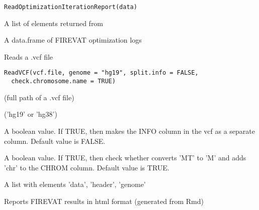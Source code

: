 \documentclass[letterpaper]{book}
\begin{document}
%
\begin{Usage}
\begin{verbatim}
ReadOptimizationIterationReport(data)
\end{verbatim}
\end{Usage}
%
\begin{Arguments}
\begin{ldescription}
\item[\code{data}] A list of elements returned from 
\end{ldescription}
\end{Arguments}
%
\begin{Value}
A data.frame of FIREVAT optimization logs
\end{Value}
%
\begin{Description}\relax
Reads a .vcf file
\end{Description}
%
\begin{Usage}
\begin{verbatim}
ReadVCF(vcf.file, genome = "hg19", split.info = FALSE,
  check.chromosome.name = TRUE)
\end{verbatim}
\end{Usage}
%
\begin{Arguments}
\begin{ldescription}
\item[\code{vcf.file}] (full path of a .vcf file)

\item[\code{genome}] ('hg19' or 'hg38')

\item[\code{split.info}] A boolean value. If TRUE, then makes the INFO column in the vcf
as a separate column. Default value is FALSE.

\item[\code{check.chromosome.name}] A boolean value. If TRUE, then check whether converts
'MT' to 'M' and adds 'chr' to the CHROM column. Default value is TRUE.
\end{ldescription}
\end{Arguments}
%
\begin{Value}
A list with elements 'data', 'header', 'genome'
\end{Value}
%
\begin{Description}\relax
Reports FIREVAT results in html format (generated from Rmd)
\end{Description}
\end{document}

